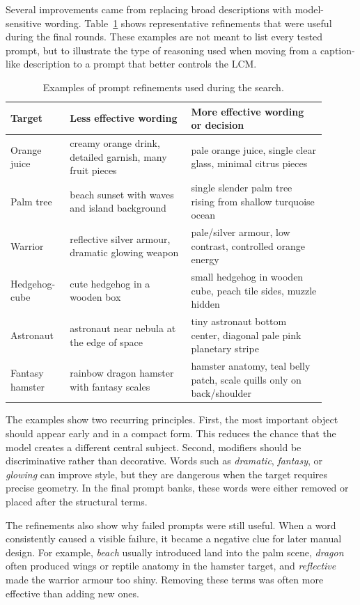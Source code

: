 \documentclass[runningheads]{llncs}
\begin{document}
Several improvements came from replacing broad descriptions with model-sensitive wording. Table~\ref{tab:examples} shows representative refinements that were useful during the final rounds. These examples are not meant to list every tested prompt, but to illustrate the type of reasoning used when moving from a caption-like description to a prompt that better controls the LCM.

\begin{table}[H]
\centering
\caption{Examples of prompt refinements used during the search.}
\label{tab:examples}
\footnotesize
\begin{tabular}{p{0.16\linewidth}p{0.35\linewidth}p{0.39\linewidth}}
\toprule
Target & Less effective wording & More effective wording or decision \\
\midrule
Orange juice & creamy orange drink, detailed garnish, many fruit pieces & pale orange juice, single clear glass, minimal citrus pieces \\
Palm tree & beach sunset with waves and island background & single slender palm tree rising from shallow turquoise ocean \\
Warrior & reflective silver armour, dramatic glowing weapon & pale/silver armour, low contrast, controlled orange energy \\
Hedgehog-cube & cute hedgehog in a wooden box & small hedgehog in wooden cube, peach tile sides, muzzle hidden \\
Astronaut & astronaut near nebula at the edge of space & tiny astronaut bottom center, diagonal pale pink planetary stripe \\
Fantasy hamster & rainbow dragon hamster with fantasy scales & hamster anatomy, teal belly patch, scale quills only on back/shoulder \\
\bottomrule
\end{tabular}
\end{table}

The examples show two recurring principles. First, the most important object should appear early and in a compact form. This reduces the chance that the model creates a different central subject. Second, modifiers should be discriminative rather than decorative. Words such as \emph{dramatic}, \emph{fantasy}, or \emph{glowing} can improve style, but they are dangerous when the target requires precise geometry. In the final prompt banks, these words were either removed or placed after the structural terms.

The refinements also show why failed prompts were still useful. When a word consistently caused a visible failure, it became a negative clue for later manual design. For example, \emph{beach} usually introduced land into the palm scene, \emph{dragon} often produced wings or reptile anatomy in the hamster target, and \emph{reflective} made the warrior armour too shiny. Removing these terms was often more effective than adding new ones.
\end{document}
